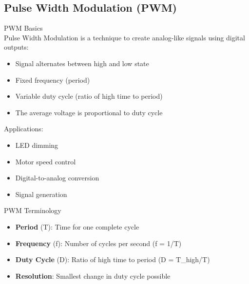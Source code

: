 \subsection{Pulse Width Modulation (PWM)}

\begin{concept}{PWM Basics}\\
Pulse Width Modulation is a technique to create analog-like signals using digital outputs:
\begin{itemize}
    \item Signal alternates between high and low state
    \item Fixed frequency (period)
    \item Variable duty cycle (ratio of high time to period)
    \item The average voltage is proportional to duty cycle
\end{itemize}
Applications:
\begin{itemize}
    \item LED dimming
    \item Motor speed control
    \item Digital-to-analog conversion
    \item Signal generation
\end{itemize}
\end{concept}

\begin{definition}{PWM Terminology}
\begin{itemize}
    \item \textbf{Period} (T): Time for one complete cycle
    \item \textbf{Frequency} (f): Number of cycles per second (f = 1/T)
    \item \textbf{Duty Cycle} (D): Ratio of high time to period (D = T\_{high}/T)
    \item \textbf{Resolution}: Smallest change in duty cycle possible
\end{itemize}
\end{definition}

